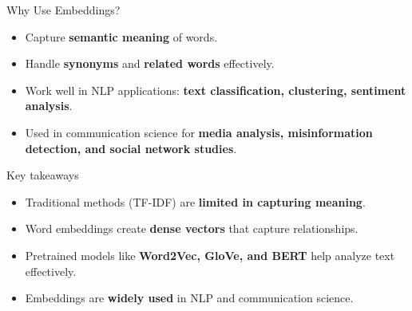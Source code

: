 \documentclass[handout]{beamer}
\begin{document}
\begin{frame}[fragile]{Why Use Embeddings?}
    \begin{itemize}
        \item Capture \textbf{semantic meaning} of words.
        \item Handle \textbf{synonyms} and \textbf{related words} effectively.
        \item Work well in NLP applications: \textbf{text classification, clustering, sentiment analysis}.
        \item Used in communication science for \textbf{media analysis, misinformation detection, and social network studies}.
    \end{itemize}
\end{frame}

\begin{frame}{Key takeaways}
    \begin{itemize}
        \item Traditional methods (TF-IDF) are \textbf{limited in capturing meaning}.
        \item Word embeddings create \textbf{dense vectors} that capture relationships.
        \item Pretrained models like \textbf{Word2Vec, GloVe, and BERT} help analyze text effectively.
        \item Embeddings are \textbf{widely used} in NLP and communication science.
    \end{itemize}
\end{frame}
\end{document}
